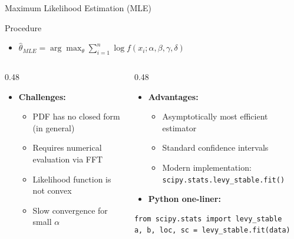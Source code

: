 \documentclass[9pt, aspectratio=169, t]{beamer}
\begin{document}
\begin{frame}[fragile]{Maximum Likelihood Estimation (MLE)}
\begin{block}{Procedure}
\begin{itemize}\setlength{\itemsep}{0pt}
    \item $\hat{\theta}_{MLE} = \arg\max_{\theta} \sum_{i=1}^{n} \log f(x_i; \alpha, \beta, \gamma, \delta)$
\end{itemize}
\end{block}

\begin{columns}[T]
\begin{column}{0.48\textwidth}
\begin{itemize}\setlength{\itemsep}{0pt}
    \item \textbf{Challenges:}
    \begin{itemize}\setlength{\itemsep}{0pt}
        \item PDF has no closed form (in general)
        \item Requires numerical evaluation via FFT
        \item Likelihood function is not convex
        \item Slow convergence for small $\alpha$
    \end{itemize}
\end{itemize}
\end{column}
\begin{column}{0.48\textwidth}
\begin{itemize}\setlength{\itemsep}{0pt}
    \item \textbf{Advantages:}
    \begin{itemize}\setlength{\itemsep}{0pt}
        \item Asymptotically most efficient estimator
        \item Standard confidence intervals
        \item Modern implementation: \texttt{scipy.stats.levy\_stable.fit()}
    \end{itemize}
    \item \textbf{Python one-liner:}
\end{itemize}
\begin{lstlisting}
from scipy.stats import levy_stable
a, b, loc, sc = levy_stable.fit(data)
\end{lstlisting}
\end{column}
\end{columns}
\end{frame}
\end{document}
